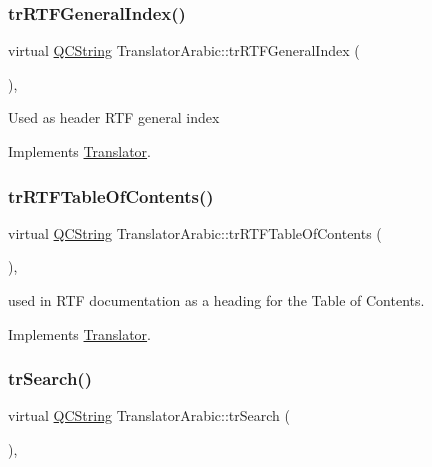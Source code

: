 \mbox{\label{class_translator_arabic_ab7697710fd8381e9b2439afb69fb1894}} 
\subsubsection{\texorpdfstring{trRTFGeneralIndex()}{trRTFGeneralIndex()}}
{\footnotesize\ttfamily virtual \mbox{\hyperlink{class_q_c_string}{Q\+C\+String}} Translator\+Arabic\+::tr\+R\+T\+F\+General\+Index (\begin{DoxyParamCaption}{ }\end{DoxyParamCaption})\hspace{0.3cm}{\ttfamily [inline]}, {\ttfamily [virtual]}}

Used as header R\+TF general index 

Implements \mbox{\hyperlink{class_translator}{Translator}}.

\mbox{\label{class_translator_arabic_a16112f2d3d309019839aa56d43e265fe}} 
\subsubsection{\texorpdfstring{trRTFTableOfContents()}{trRTFTableOfContents()}}
{\footnotesize\ttfamily virtual \mbox{\hyperlink{class_q_c_string}{Q\+C\+String}} Translator\+Arabic\+::tr\+R\+T\+F\+Table\+Of\+Contents (\begin{DoxyParamCaption}{ }\end{DoxyParamCaption})\hspace{0.3cm}{\ttfamily [inline]}, {\ttfamily [virtual]}}

used in R\+TF documentation as a heading for the Table of Contents. 

Implements \mbox{\hyperlink{class_translator}{Translator}}.

\mbox{\label{class_translator_arabic_ac7945d5df6b91d1daa50aeb3b6993231}} 
\subsubsection{\texorpdfstring{trSearch()}{trSearch()}}
{\footnotesize\ttfamily virtual \mbox{\hyperlink{class_q_c_string}{Q\+C\+String}} Translator\+Arabic\+::tr\+Search (\begin{DoxyParamCaption}{ }\end{DoxyParamCaption})\hspace{0.3cm}{\ttfamily [inline]}, {\ttfamily [virtual]}}

